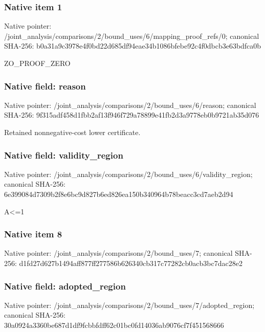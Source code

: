 \documentclass[10pt,a4paper]{article}
\begin{document}
\subsubsection{Native item 1}
Native pointer: /joint\_\allowbreak{}analysis/comparisons/2/bound\_\allowbreak{}uses/6/mapping\_\allowbreak{}proof\_\allowbreak{}refs/0; canonical SHA-256: b0a31a9c3978e4f0bd22d685df94eae34b1086bfebe92c4f0dbcb3e63bdfca0b

\begingroup\raggedright\sloppy ZO\_\allowbreak{}PROOF\_\allowbreak{}ZERO\par\endgroup

\subsubsection{Native field: reason}
Native pointer: /joint\_\allowbreak{}analysis/comparisons/2/bound\_\allowbreak{}uses/6/reason; canonical SHA-256: 9f315adf458d1fbb2af13f946f729a78899e41fb2d3a9778eb0b9721ab35d076

\begingroup\raggedright\sloppy Retained nonnegative-cost lower certificate.\par\endgroup

\subsubsection{Native field: validity\_\allowbreak{}region}
Native pointer: /joint\_\allowbreak{}analysis/comparisons/2/bound\_\allowbreak{}uses/6/validity\_\allowbreak{}region; canonical SHA-256: 6e399084d7309b2f8e6bc9d827b6ed826ea150b340964b78beacc3cd7aeb2d94

\begingroup\raggedright\sloppy A<=\allowbreak{}1\par\endgroup

\subsubsection{Native item 8}
Native pointer: /joint\_\allowbreak{}analysis/comparisons/2/bound\_\allowbreak{}uses/7; canonical SHA-256: d1fd27d627b1494aff877ff277586b626340cb317c77282cb0acb3bc7dac28e2

\subsubsection{Native field: adopted\_\allowbreak{}region}
Native pointer: /joint\_\allowbreak{}analysis/comparisons/2/bound\_\allowbreak{}uses/7/adopted\_\allowbreak{}region; canonical SHA-256: 30a0924a3360be687d1df9fcbbfdff62c01bc0fd14036ab9076cf7f451568666
\end{document}
